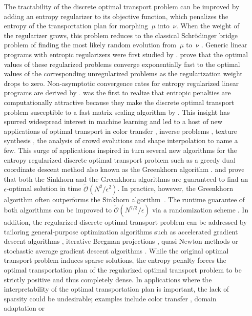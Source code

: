 \documentclass[11pt, a4paper, oneside, reqno]{article}
\begin{document}
	The tractability of the discrete optimal transport problem can be improved by adding an entropy regularizer to its objective function, which penalizes the entropy of the transportation plan for morphing~$\mu$ into~$\nu$. When the weight of the regularizer grows, this problem reduces to the classical Schr\"odinger bridge problem of finding the most likely random evolution from~$\mu$ to~$\nu$ \citep{schrodinger1931umkehrung}. Generic linear programs with entropic regularizers were first studied by \citet{fang1992unconstrained}. \citet{cominetti1994asymptotic} prove that the optimal values of these regularized problems converge exponentially fast to the optimal values of the corresponding unregularized problems as the regularization weight drops to zero. 
	Non-asymptotic convergence rates for entropy regularized linear programs are derived by \citet{weed2018explicit}.
	\citet{sinkhorn} was the first to realize that entropic penalties are computationally attractive because they make the discrete optimal transport problem susceptible to a fast matrix scaling algorithm by \citet{sinkhorn1967diagonal}. This insight has spurred widespread interest in machine learning and led to a host of new applications of optimal transport in	color transfer \citep{chizat2016scaling}, inverse problems \citep{karlsson2017generalized, adler2017learning}, texture synthesis \citep{peyre2017quantum}, the analysis of crowd evolutions \citep{peyre2015entropic} and shape interpolation \citep{solomon2015convolutional} to name a few. This surge of applications inspired in turn several new algorithms for the entropy regularized discrete optimal transport problem such as a greedy dual coordinate descent method also known as the Greenkhorn algorithm \citep{altschuler2017near, chakrabarty2018better, abid2018greedy}.
	\citet{dvurechensky2018computational} and \citet{lin2019efficient} prove that both the Sinkhorn and the Greenkhorn algorithms are guaranteed to find an $\epsilon$-optimal solution in time $\tilde{\mathcal{O}}({N^2}/{\epsilon^2})$. In practice, however, the Greenkhorn algorithm often outperforms the Sinkhorn algorithm~\citep{lin2019efficient}. The runtime guarantee of both algorithms can be improved to $\tilde{\mathcal{O}}(N^{7/3}/\epsilon)$ via a randomization scheme \citep{lin2019acceleration}.
	In addition, the regularized discrete optimal transport problem can be addressed by tailoring general-purpose optimization algorithms such as accelerated gradient descent algorithms \citep{dvurechensky2018computational}, iterative Bregman projections \citep{benamou2015iterative}, quasi-Newton methods \citep{blondel2017smooth} or stochastic average gradient descent algorithms \citep{genevay2016stochastic}. While the original optimal transport problem induces sparse solutions, the entropy penalty forces the optimal transportation plan of the regularized optimal transport problem to be strictly positive and thus completely dense. In applications where the interpretability of the optimal transportation plan is important, the lack of sparsity could be undesirable; examples include color transfer \citep{pitie2007automated}, domain adaptation \citep{courty2016optimal} or
\end{document}
